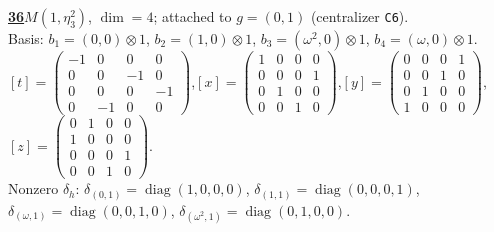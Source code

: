 \begin{samepage}\noindent\textbf{\underline{36}}\quad $M(1,\eta^{2}_{3})$, $\dim=4$; attached to $g=(0,1)$ (centralizer \texttt{C6}).\\
Basis: $b_{1}=(0,0)\otimes 1$, $b_{2}=(1,0)\otimes 1$, $b_{3}=(\omega^2,0)\otimes 1$, $b_{4}=(\omega,0)\otimes 1$.\\
$[t]=\left(\begin{smallmatrix} -1 & 0 & 0 & 0 \\ 0 & 0 & -1 & 0 \\ 0 & 0 & 0 & -1 \\ 0 & -1 & 0 & 0 \end{smallmatrix}\right)$,\quad $[x]=\left(\begin{smallmatrix} 1 & 0 & 0 & 0 \\ 0 & 0 & 0 & 1 \\ 0 & 1 & 0 & 0 \\ 0 & 0 & 1 & 0 \end{smallmatrix}\right)$,\quad $[y]=\left(\begin{smallmatrix} 0 & 0 & 0 & 1 \\ 0 & 0 & 1 & 0 \\ 0 & 1 & 0 & 0 \\ 1 & 0 & 0 & 0 \end{smallmatrix}\right)$,\quad $[z]=\left(\begin{smallmatrix} 0 & 1 & 0 & 0 \\ 1 & 0 & 0 & 0 \\ 0 & 0 & 0 & 1 \\ 0 & 0 & 1 & 0 \end{smallmatrix}\right)$.\\
Nonzero $\delta_h$: $\delta_{(0,1)}=\operatorname{diag}(1,0,0,0)$, $\delta_{(1,1)}=\operatorname{diag}(0,0,0,1)$, $\delta_{(\omega,1)}=\operatorname{diag}(0,0,1,0)$, $\delta_{(\omega^2,1)}=\operatorname{diag}(0,1,0,0)$.\end{samepage}
\medskip

